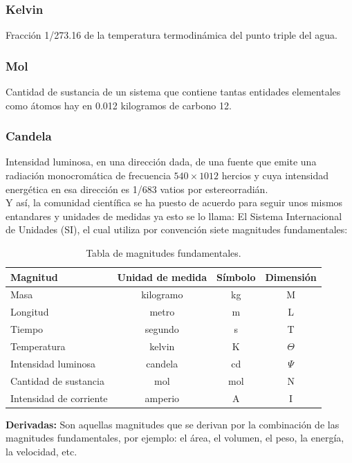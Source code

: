 \documentclass[a5paper,pagesize,10pt,bibtotoc,pointlessnumbers,
normalheadings,DIV=9,fleqn,x11names,table,twoside=false]{scrbook}
\begin{document}
\subsubsection{Kelvin}

Fracción 1/273.16 de la temperatura termodinámica del punto triple del agua.

\subsubsection{Mol}

Cantidad de sustancia de un sistema que contiene tantas entidades elementales como átomos hay en 0.012 kilogramos de carbono 12.

\subsubsection{Candela}

Intensidad luminosa, en una dirección dada, de una fuente que emite una radiación monocromática de frecuencia $540 \times 1012$ 
hercios y cuya intensidad energética en esa dirección es 1/683 vatios por estereorradián.\\ 

Y así, la comunidad científica se ha puesto de acuerdo para seguir unos mismos entandares y unidades de medidas ya esto se lo 
llama: El Sistema Internacional de Unidades (SI), el cual utiliza por convención siete magnitudes fundamentales: 

\begin{table}[H]
\centering
\begin{tabular}{lccc}
\hline
Magnitud & Unidad de medida & Símbolo & Dimensión\\
\hline
Masa & kilogramo & kg & M\\
Longitud & metro & m & L\\
Tiempo & segundo & s & T\\
Temperatura & kelvin & K & $\Theta$ \\
Intensidad luminosa & candela & cd & $\Psi$\\
Cantidad de sustancia & mol & mol & N\\
Intensidad de corriente & amperio & A & I\\
\hline
\end{tabular}
\caption{Tabla de magnitudes fundamentales.} 
\end{table}

\textbf{Derivadas:} Son aquellas magnitudes que se derivan por la combinación de las magnitudes fundamentales, por ejemplo: el 
área, el volumen, el peso, la energía, la velocidad, etc.\\
\end{document}
